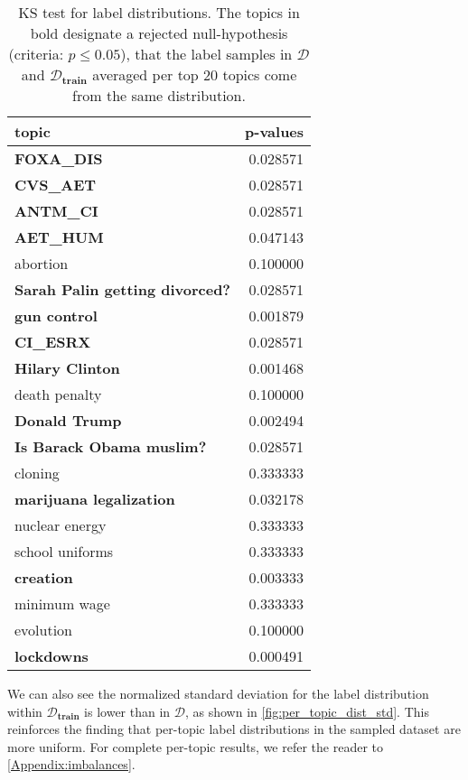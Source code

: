 \documentclass[11pt]{article}
\begin{document}
\begin{table}[t]
\centering
\fontsize{8}{9}\selectfont
\begin{tabular}{@{}lr@{}}
\toprule
topic                                  & p-values \\ \midrule
\textbf{FOXA\_DIS}                     & 0.028571 \\
\textbf{CVS\_AET}                      & 0.028571 \\
\textbf{ANTM\_CI}                      & 0.028571 \\
\textbf{AET\_HUM}                      & 0.047143 \\
abortion                               & 0.100000 \\
\textbf{Sarah Palin getting divorced?} & 0.028571 \\
\textbf{gun control}                   & 0.001879 \\
\textbf{CI\_ESRX}                      & 0.028571 \\
\textbf{Hilary Clinton}                & 0.001468 \\
death penalty                          & 0.100000 \\
\textbf{Donald Trump}                  & 0.002494 \\
\textbf{Is Barack Obama muslim?}       & 0.028571 \\
cloning                                & 0.333333 \\
\textbf{marijuana legalization}        & 0.032178 \\
nuclear energy                         & 0.333333 \\
school uniforms                        & 0.333333 \\
\textbf{creation}                      & 0.003333 \\
minimum wage                           & 0.333333 \\
evolution                              & 0.100000 \\
\textbf{lockdowns}                     & 0.000491 \\ \bottomrule
\end{tabular}
\caption{KS test for label distributions. The topics in bold designate a rejected null-hypothesis (criteria: $p\leq0.05$), that the label samples in $\mathcal{D}$ and $\mathcal{D}_\textbf{train}$ averaged per top $20$ topics come from the same distribution.}
\label{tab:per_topic_imbalance}
\end{table}

We can also see the normalized standard deviation for the label distribution within $\mathcal{D}_\textbf{train}$ is lower than in $\mathcal{D}$, as shown in \autoref{fig:per_topic_dist_std}. This reinforces the finding that per-topic label distributions in the sampled dataset are more uniform. For complete per-topic results, we refer the reader to  \autoref{Appendix:imbalances}.
\end{document}
